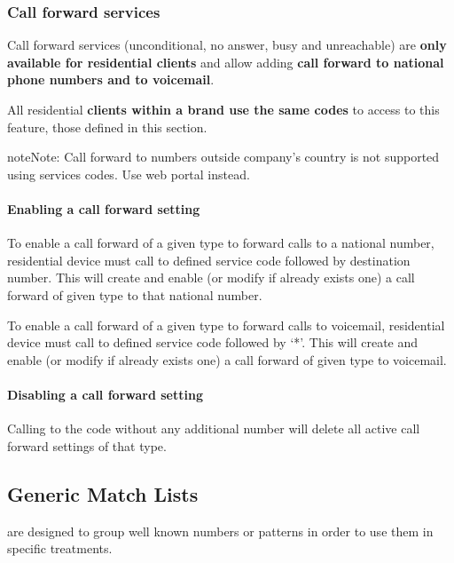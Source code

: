 \documentclass[letterpaper,10pt,english]{sphinxmanual}
\begin{document}
\subsubsection{Call forward services}
\label{administration_portal/brand/settings/generic_services:call-forward-services}\label{administration_portal/brand/settings/generic_services:id1}
Call forward services (unconditional, no answer, busy and unreachable) are \textbf{only available for residential clients}
and allow adding \textbf{call forward to national phone numbers and to voicemail}.

All residential \textbf{clients within a brand use the same codes} to access to this feature, those defined in this section.

\begin{notice}{note}{Note:}
Call forward to numbers outside company's country is not supported using services codes.
Use web portal instead.
\end{notice}
\paragraph{Enabling a call forward setting}

To enable a call forward of a given type to forward calls to a national number, residential device must call to defined
service code followed by destination number. This will create and enable (or modify if already exists one) a call
forward of given type to that national number.

To enable a call forward of a given type to forward calls to voicemail, residential device must call to defined
service code followed by `*'. This will create and enable (or modify if already exists one) a call
forward of given type to voicemail.
\paragraph{Disabling a call forward setting}

Calling to the code without any additional number will delete all active call forward settings of that type.


\subsection{Generic Match Lists}
\label{administration_portal/brand/settings/generic_match_lists:generic-match-lists}\label{administration_portal/brand/settings/generic_match_lists::doc}\label{administration_portal/brand/settings/generic_match_lists:brand-match-lists}
{\hyperref[administration_portal/client/vpbx/routing_tools/match_lists:id1]{}} are designed to group well known numbers or patterns in order to use them in specific treatments.
\end{document}
